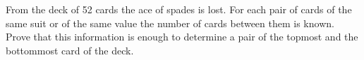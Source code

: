 \problem
From the deck of 52 cards the ace of spades is lost.
For each pair of cards of the same suit or of the same value the number of
cards between them is known.
Prove that this information is enough to determine a pair of the topmost and
the bottommost card of the deck.
\solution
\endproblem
